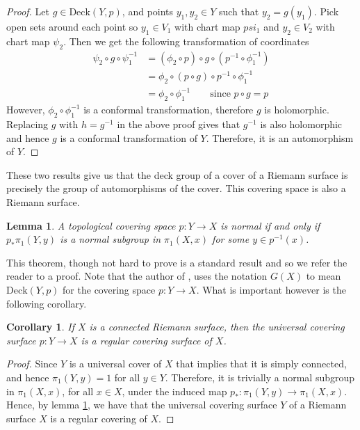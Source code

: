 \documentclass[11pt]{report}
\newtheorem{lemma}[thm]{Lemma}
\newtheorem{cor}[thm]{Corollary}
\theoremstyle{definition}
\begin{document}
\begin{proof}
  Let $g \in \text{Deck}(Y,p)$, and points $y_1,y_2 \in Y$ such that $y_2 = g(y_1)$. Pick open sets around each point so $y_1 \in V_1$ with chart map $psi_1$ and $y_2 \in V_2$ with chart map $\psi_2$. Then we get the following transformation of coordinates
  \begin{align*}
    \psi_2\circ g \circ\psi_1^{-1} &= (\phi_2 \circ p) \circ g \circ (p^{-1}\circ \phi_1^{-1})\\
    &= \phi_2 \circ (p \circ g) \circ p^{-1}\circ \phi_1^{-1}\\
    &= \phi_2 \circ \phi_1^{-1} \qquad\text{since }p\circ g = p
  \end{align*}
  However, $\phi_2 \circ \phi_1^{-1}$ is a conformal transformation, therefore $g$ is holomorphic. Replacing $g$ with $h = g^{-1}$ in the above proof gives that $g^{-1}$ is also holomorphic and hence $g$ is a conformal transformation of $Y$. Therefore, it is an automorphism of $Y$.
\end{proof}
These two results give us that the deck group of a cover of a Riemann surface is precisely the group of automorphisms of the cover. This covering space is also a Riemann surface.
\begin{lemma}\cite[Proposition 1.39]{Hatchers}\label{LemmaOnCoveringSurfaces}
  A topological covering space $p:Y \rightarrow X$ is normal if and only if $p_*\pi_1(Y,y)$ is a normal subgroup in $\pi_1(X,x)$ for some $y \in p^{-1}(x)$.
\end{lemma}
This theorem, though not hard to prove is a standard result and so we refer the reader to a proof. Note that the author of \cite{Hatchers}, uses the notation $G(X)$ to mean $\text{Deck}(Y,p)$ for the covering space $p:Y \rightarrow X$. What is important however is the following corollary.
\begin{cor}
  If $X$ is a connected Riemann surface, then the universal covering surface $p:Y \rightarrow X$ is a regular covering surface of $X$.
\end{cor}
\begin{proof}
  Since $Y$ is a universal cover of $X$ that implies that it is simply connected, and hence $\pi_1(Y,y)=1$ for all $y\in Y$. Therefore, it is trivially a normal subgroup in $\pi_1(X,x)$, for all $x \in X$, under the induced map $p_*\colon \pi_1(Y,y) \rightarrow \pi_1(X,x)$. Hence, by lemma \ref{LemmaOnCoveringSurfaces}, we have that the universal covering surface $Y$ of a Riemann surface $X$ is a regular covering of $X$.
\end{proof}
\end{document}
